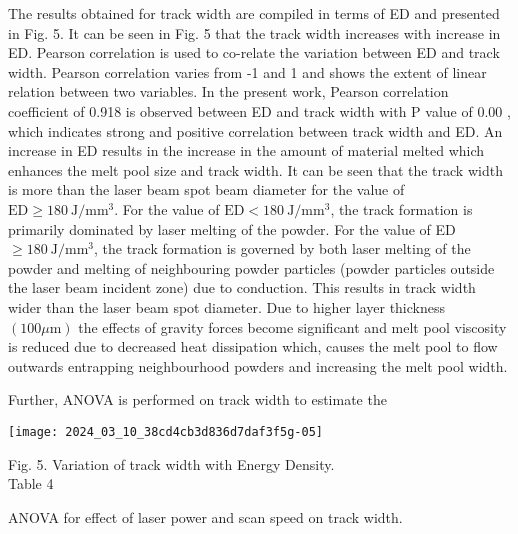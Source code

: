 \documentclass[10pt]{article}
\begin{document}
The results obtained for track width are compiled in terms of ED and presented in Fig. 5. It can be seen in Fig. 5 that the track width increases with increase in ED. Pearson correlation is used to co-relate the variation between ED and track width. Pearson correlation varies from -1 and 1 and shows the extent of linear relation between two variables. In the present work, Pearson correlation coefficient of 0.918 is observed between ED and track width with $\mathrm{P}$ value of 0.00 , which indicates strong and positive correlation between track width and ED. An increase in ED results in the increase in the amount of material melted which enhances the melt pool size and track width. It can be seen that the track width is more than the laser beam spot beam diameter for the value of $\mathrm{ED} \geq 180 \mathrm{~J} / \mathrm{mm}^{3}$. For the value of $\mathrm{ED}<180 \mathrm{~J} / \mathrm{mm}^{3}$, the track formation is primarily dominated by laser melting of the powder. For the value of ED $\geq 180 \mathrm{~J} / \mathrm{mm}^{3}$, the track formation is governed by both laser melting of the powder and melting of neighbouring powder particles (powder particles outside the laser beam incident zone) due to conduction. This results in track width wider than the laser beam spot diameter. Due to higher layer thickness $(100 \mu \mathrm{m})$ the effects of gravity forces become significant and melt pool viscosity is reduced due to decreased heat dissipation which, causes the melt pool to flow outwards entrapping neighbourhood powders and increasing the melt pool width.

Further, ANOVA is performed on track width to estimate the

\begin{center}
\texttt{[image: 2024\_03\_10\_38cd4cb3d836d7daf3f5g-05]}
\end{center}

Fig. 5. Variation of track width with Energy Density.\\
Table 4

ANOVA for effect of laser power and scan speed on track width.
\end{document}
